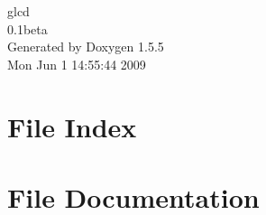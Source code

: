 \documentclass[a4paper]{book}
\begin{document}
\begin{titlepage}
\vspace*{7cm}
\begin{center}
{\Large glcd \\[1ex]\large 0.1beta }\\
\vspace*{1cm}
{\large Generated by Doxygen 1.5.5}\\
\vspace*{0.5cm}
{\small Mon Jun 1 14:55:44 2009}\\
\end{center}
\end{titlepage}
\clearemptydoublepage
{}
\tableofcontents
\clearemptydoublepage
{}
\chapter{File Index}

\chapter{File Documentation}












\printindex
\end{document}
